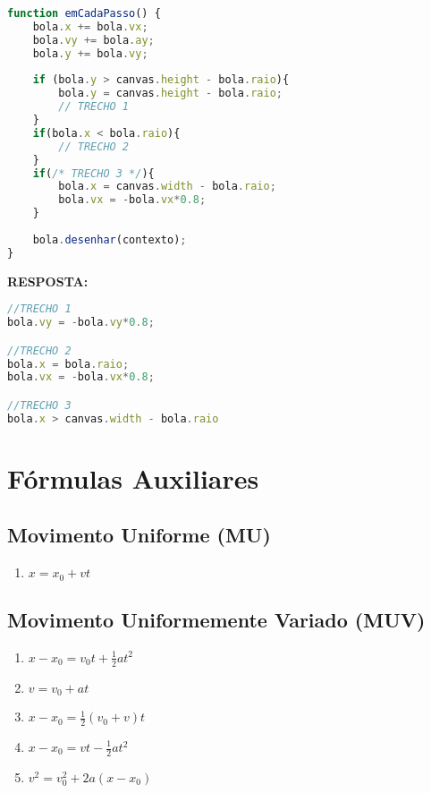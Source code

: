 \documentclass[12pt,a4paper,oneside]{article}
\begin{document}
\begin{enumerate}
\begin{lstlisting}[language=JavaScript]
function emCadaPasso() {    
	bola.x += bola.vx;
	bola.vy += bola.ay;
	bola.y += bola.vy;
	
	if (bola.y > canvas.height - bola.raio){ 
		bola.y = canvas.height - bola.raio; 
		// TRECHO 1
	}
	if(bola.x < bola.raio){
		// TRECHO 2
	}
	if(/* TRECHO 3 */){
		bola.x = canvas.width - bola.raio;
		bola.vx = -bola.vx*0.8;
	}
	
	bola.desenhar(contexto); 
}\end{lstlisting}

{\color{blue} \bf RESPOSTA: } \\
\begin{lstlisting}[language=JavaScript]
//TRECHO 1
bola.vy = -bola.vy*0.8;

//TRECHO 2
bola.x = bola.raio;
bola.vx = -bola.vx*0.8;

//TRECHO 3
bola.x > canvas.width - bola.raio
\end{lstlisting}

\end{enumerate}

\newpage
 
\section{Fórmulas Auxiliares}

\subsection{Movimento Uniforme (MU)}

\begin{enumerate}
\item $x = x_0 + vt$ 
\end{enumerate}

\subsection{Movimento Uniformemente Variado (MUV)}

\begin{enumerate}
\item $x - x_0 = v_0t + \frac{1}{2}at^2$ 
\item $v = v_0 + at$ 
\item $x - x_0 = \frac{1}{2}(v_0 + v)t$ 
\item $x - x_0 = vt - \frac{1}{2} a t^2$
\item $v^2 = v_0^2 + 2a(x - x_0)$
\end{enumerate}
\end{document}
